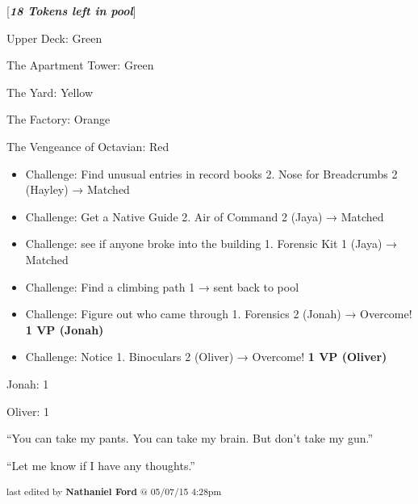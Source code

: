 {[}\textit{\textbf{18 Tokens left in pool}}{]}



{
\parskip=0pt
Upper Deck: Green

The Apartment Tower: Green

The Yard: Yellow

The Factory: Orange

The Vengeance of Octavian: Red
}




{
\parskip=0pt
\begin{itemize}
\item Challenge: Find unusual entries in record books 2.  Nose for Breadcrumbs 2 (Hayley) → Matched
\item Challenge: Get a Native Guide 2.  Air of Command 2 (Jaya) → Matched
\item Challenge: see if anyone broke into the building 1. Forensic Kit 1 (Jaya) → Matched
\item Challenge: Find a climbing path 1 → sent back to pool
\item Challenge: Figure out who came through 1.  Forensics 2 (Jonah) → Overcome! \textbf{1 VP (Jonah)}
\item Challenge: Notice 1.  Binoculars 2 (Oliver) → Overcome! \textbf{1 VP (Oliver)}
\end{itemize}
}



{
\parskip=0pt
Jonah: 1

Oliver: 1
}


``You can take my pants.  You can take my brain.  But don't take my gun.''




``Let me know if I have any thoughts.''



\vspace{\fill}

\begin{flushright}
\textsubscript{last edited by \textbf{Nathaniel Ford} @ 05/07/15 4:28pm}
\end{flushright}

